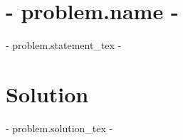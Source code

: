 \documentclass[11pt]{article}
\begin{document}
\section*{ {{- problem.name -}} }

{{- problem.statement_tex -}}

\section*{Solution}

{{- problem.solution_tex -}}
\end{document}
